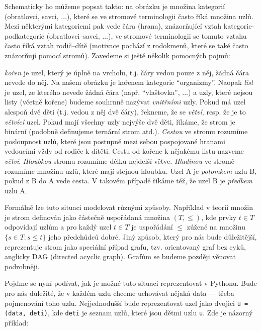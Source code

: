 Schematicky ho můžeme popsat takto: na obrázku je množina kategorií (obratlovci, savci, $\ldots$), které se ve stromové terminologii často říká množina
uzlů. Mezi některými kategoriemi pak vede čára (hrana), znázorňující vztah kategorie-podkategorie (obratlovci--savci, $\ldots$), ve stromové terminologii se tomuto vztahu 
často říká vztah rodič--dítě (motivace pochází z rodokmenů, které se také často znázorňují pomocí stromů). Zavedeme si ještě několik pomocných pojmů:

\begin{definition}
\emph{kořen} je uzel, který je úplně na vrcholu, t.j. čáry vedou pouze z něj, žádná čára nevede do něj. Na našem obrázku je kořenem kategorie ``organizmy''.
Naopak \emph{list} je uzel, ze kterého nevede žádná čára (např. ``vlaštovka'', ...) a uzly, které nejsou listy (včetně kořene) budeme souhrnně nazývat
\emph{vnitřními} uzly. Pokud má uzel alespoň dvě děti (t.j. vedou z něj dvě čáry), řekneme, že se \emph{větví}, resp. že je to \emph{větvící} uzel.
Pokud mají všechny uzly nejvýše dvě děti, říkáme, že strom je binární (podobně definujeme ternární strom atd.). \emph{Cestou} ve stromu rozumíme posloupnost uzlů, 
které jsou postupně mezi sebou pospojované hranami vedoucími vždy od rodiče k dítěti. Cestu od kořene k nějakému 
listu nazveme \emph{větví}. \emph{Hloubkou} stromu rozumíme délku nejdelší větve. \emph{Hladinou} ve stromě rozumíme množinu uzlů, které mají stejnou hloubku.
Uzel A je \emph{potomkem} uzlu B, pokud z B do A vede cesta. V takovém případě říkáme též, že uzel B je \emph{předkem} uzlu A. 
\end{definition}

\begin{note}\footnotesize
Formálně lze tuto situaci modelovat různými způsoby. Například v teorii množin je strom definován jako částečně uspořádaná množina $(T,\leq)$,
kde prvky $t\in T$ odpovídají uzlům a pro každý uzel $t\in T$ je uspořádání $\leq$ zúžené na množinu $\{s\in T:s\leq t\}$ jeho předchůdců dobré.
Jiný způsob, který pro nás bude důležitější, reprezentuje strom jako speciální případ grafu, tzv. orientovaný graf bez cyků, anglicky DAG (directed acyclic graph).
Grafům se budeme později věnovat podrobněji.
\end{note}

Pojďme se nyní podívat, jak je možné tuto situaci reprezentovat v Pythonu. Bude pro nás důležité, že v každém uzlu
chceme uchovávat nějaká data --- třeba pojmenování toho uzlu. Nejjednodušší bude reprezentovat uzel jako dvojici  {\tt u = (data, deti)}, 
kde {\tt deti} je seznam uzlů, které jsou dětmi uzlu {\tt u}. Zde je názorný příklad:

